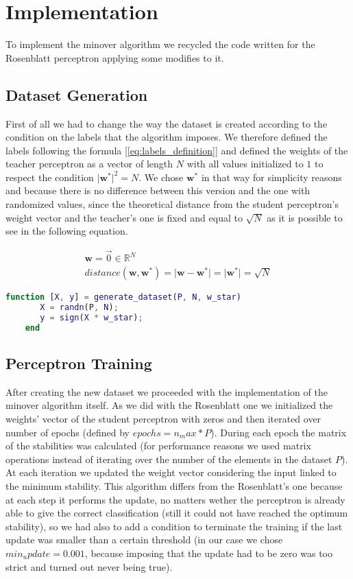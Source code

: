 \section{Implementation}
\label{sec:implementation}

To implement the minover algorithm we recycled the code written for the Rosenblatt perceptron applying some modifies to it.

\subsection{Dataset Generation}
First of all we had to change the way the dataset is created according to the condition on the labels that the algorithm imposes.
We therefore defined the labels following the formula [\ref{eq:labels_definition}] and defined the weights of the teacher perceptron
as a vector of length $N$ with all values initialized to $1$ to respect the condition $\lvert \mathsf{\bm{w}}^* \rvert^2 = N$.
We chose $\mathsf{\bm{w}}^*$ in that way for simplicity reasons and because there is no difference between this version and
the one with randomized values, since the theoretical distance from the student perceptron's weight vector and the teacher's one is
fixed and equal to $\sqrt{N}$ as it is possible to see in the following equation.

\begin{gather*}
    \mathsf{\bm{w}} = \overrightarrow{0} \in \mathbb{R}^N \\
    distance(\mathsf{\bm{w}}, \mathsf{\bm{w}}^*) = \lvert \mathsf{\bm{w}} - \mathsf{\bm{w}}^* \rvert = \lvert \mathsf{\bm{w}}^* \rvert = \sqrt{N}
\end{gather*}

\begin{lstlisting}[language=Matlab]
    function [X, y] = generate_dataset(P, N, w_star)
       X = randn(P, N);
       y = sign(X * w_star);
    end
\end{lstlisting}

\subsection{Perceptron Training}
After creating the new dataset we proceeded with the implementation of the minover algorithm itself. As we did with the Rosenblatt one
we initialized the weights' vector of the student perceptron with zeros and then iterated over number of epochs (defined by $epochs = n_max * P$).
During each epoch the matrix of the stabilities was calculated (for performance reasons we used matrix operations instead of iterating over the
number of the elements in the dataset $P$). At each iteration we updated the weight vector considering the input linked to the minimum stability.
This algorithm differs from the Rosenblatt's one because at each step it performs the update, no matters wether the perceptron is already able to give
the correct classification (still it could not have reached the optimum stability), so we had also to add a condition to terminate the training if the
last update was smaller than a certain threshold (in our case we chose $min_update = 0.001$, because imposing that the update had to be zero was too
strict and turned out never being true).


